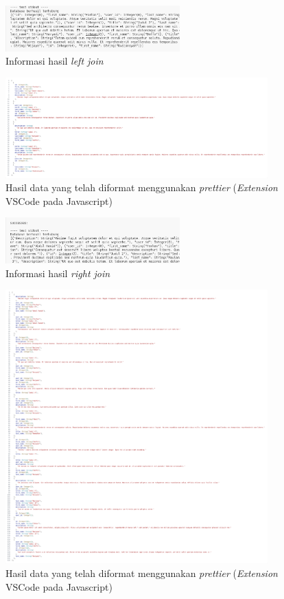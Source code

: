 \begin{enumerate}
\begin{figure}[H]
  	\centering{}
	\includegraphics[width=0.6\textwidth]{gambar/bab4/test-join-data-left.png}
  	\caption{Informasi hasil \emph{left join}}
   \end{figure}
    \begin{figure}[H]
  	\centering{}
	\includegraphics[width=0.9\textwidth]{gambar/bab4/test-join-data-left-beautify.png}
  	\caption{Hasil data yang telah diformat menggunakan \emph{prettier} (\emph{Extension} VSCode pada Javascript)}
   \end{figure}
  \begin{figure}[H]
  	\centering{}
	\includegraphics[width=0.6\textwidth]{gambar/bab4/test-join-data-right.png}
  	\caption{Informasi hasil \emph{right join}}
   \end{figure}
    \begin{figure}[H]
  	\centering{}
	\includegraphics[width=0.9\textwidth]{gambar/bab4/test-join-data-right-beautify.png}
  	\caption{Hasil data yang telah diformat menggunakan \emph{prettier} (\emph{Extension} VSCode pada Javascript)}
   \end{figure}


\end{enumerate}
